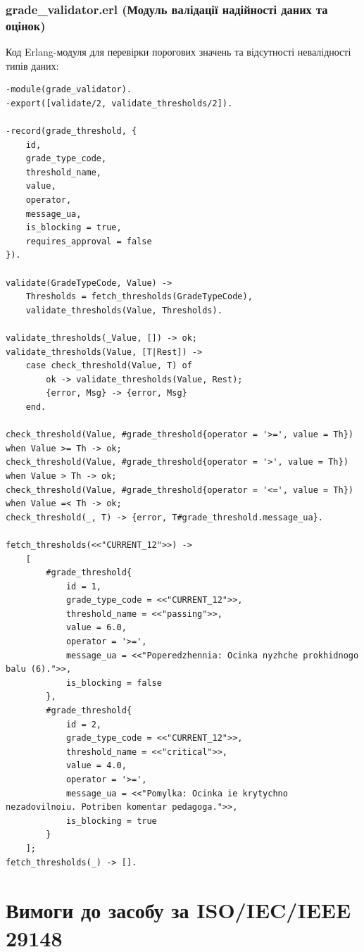 \documentclass{article}
\begin{document}
\subsubsection{grade\_validator.erl (Модуль валідації надійності даних та оцінок)}
Код Erlang-модуля для перевірки порогових значень та відсутності невалідності типів даних:
\begin{verbatim}
-module(grade_validator).
-export([validate/2, validate_thresholds/2]).

-record(grade_threshold, {
    id,
    grade_type_code,
    threshold_name,
    value,
    operator,
    message_ua,
    is_blocking = true,
    requires_approval = false
}).

validate(GradeTypeCode, Value) ->
    Thresholds = fetch_thresholds(GradeTypeCode),
    validate_thresholds(Value, Thresholds).

validate_thresholds(_Value, []) -> ok;
validate_thresholds(Value, [T|Rest]) ->
    case check_threshold(Value, T) of
        ok -> validate_thresholds(Value, Rest);
        {error, Msg} -> {error, Msg}
    end.

check_threshold(Value, #grade_threshold{operator = '>=', value = Th}) when Value >= Th -> ok;
check_threshold(Value, #grade_threshold{operator = '>', value = Th}) when Value > Th -> ok;
check_threshold(Value, #grade_threshold{operator = '<=', value = Th}) when Value =< Th -> ok;
check_threshold(_, T) -> {error, T#grade_threshold.message_ua}.

fetch_thresholds(<<"CURRENT_12">>) ->
    [
        #grade_threshold{
            id = 1,
            grade_type_code = <<"CURRENT_12">>,
            threshold_name = <<"passing">>,
            value = 6.0,
            operator = '>=',
            message_ua = <<"Poperedzhennia: Ocinka nyzhche prokhidnogo balu (6).">>,
            is_blocking = false
        },
        #grade_threshold{
            id = 2,
            grade_type_code = <<"CURRENT_12">>,
            threshold_name = <<"critical">>,
            value = 4.0,
            operator = '>=',
            message_ua = <<"Pomylka: Ocinka ie krytychno nezadovilnoiu. Potriben komentar pedagoga.">>,
            is_blocking = true
        }
    ];
fetch_thresholds(_) -> [].
\end{verbatim}

\newpage
\section{Вимоги до засобу за ISO/IEC/IEEE 29148}
\end{document}
